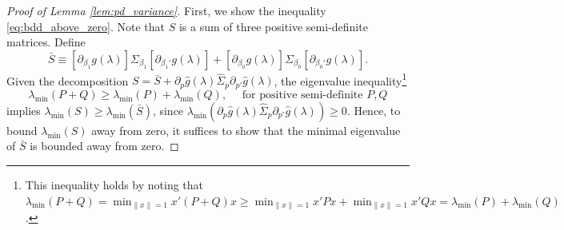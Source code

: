 \documentclass[11pt]{article}
\theoremstyle{definition}
\newcommand{\0}{\ensuremath{\mathbf{0}}}
\begin{document}
\begin{bibunit}
\bigskip


%

\begin{proof}[Proof of Lemma \ref{lem:pd_variance}]
First, we show the inequality \eqref{eq:bdd_above_zero}.
Note that $S$ is a sum of three positive semi-definite matrices. 
Define
\[
    \bar{S} \equiv [\partial_{\beta_1} g(\lambda)] \Sigma_{\beta_1} [\partial_{\beta_1'} g(\lambda)]
    + [\partial_{\beta_0} g(\lambda)] \Sigma_{\beta_0} [\partial_{\beta_0'} g(\lambda)].
\]
Given the decomposition $S = \bar{S} + \partial_p\hat{g}(\lambda)\hat{\Sigma}_p\partial_{p'}\hat{g}(\lambda)$, the eigenvalue inequality\footnote{This inequality holds by noting that $\lambda_{\min}(P+Q) = \min_{\|x\| = 1}x'(P+Q)x \geq \min_{\|x\| = 1}x'Px + \min_{\|x\| = 1}x'Qx = \lambda_{\min}(P) + \lambda_{\min}(Q)$.} 
\[
    \lambda_{\min}(P+Q) \ge \lambda_{\min}(P) + \lambda_{\min}(Q), \quad \text{ for positive semi-definite } P,Q 
\]
implies $\lambda_{\min}(S) \ge \lambda_{\min}(\bar{S})$, since $\lambda_{\min}(\partial_p\hat{g}(\lambda)\hat{\Sigma}_p\partial_{p'}\hat{g}(\lambda)) \ge 0$. Hence, to bound $\lambda_{\min}(S)$ away from zero, it suffices to show that the minimal eigenvalue of $\bar{S}$ is bounded away from zero.



\end{proof}
\end{bibunit}
\end{document}
